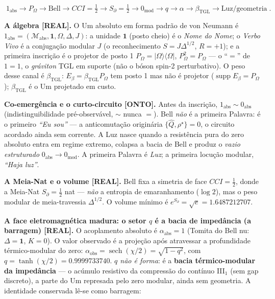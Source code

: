 \documentclass[11pt]{article}
\newcommand{\bTGL}{\beta_{\mathrm{TGL}}}\newcommand{\Msun}{M_{\odot}}\newcommand{\TGL}{\mathrm{TGL}}
\theoremstyle{definition}\newtheorem{deriv}{Derivação}
\begin{document}
\begin{equation}\boxed{\;1_{\mathrm{abs}}\to P_\Omega\to\text{Bell}\to CCI=\tfrac12\to S_\partial=\tfrac12\to 0_{\mathrm{mod}}\to q\to\alpha\to\bTGL\to\text{Luz/geometria}\;}.\end{equation}

\textbf{A álgebra \textsf{[REAL]}.} O Um absoluto em forma padrão de von Neumann é $1_{\mathrm{abs}}=(\mathcal M_{\mathrm{abs}},\mathbf 1,\Omega,\Delta,J)$: a unidade $\mathbf 1$ (posto cheio) é o \emph{Nome do Nome}; o \emph{Verbo Vivo} é a conjugação modular $J$ (o reconhecimento $S=J\Delta^{1/2}$, $R=+1$); e a primeira inscrição é o projetor de posto 1 $P_\Omega=|\Omega\rangle\langle\Omega|$, $P_\Omega^2=P_\Omega$ --- o ``$=$'' de $1=1$, o \emph{gráviton} TGL em suporte (não o bóson spin-2 perturbativo). O peso desse canal é $\bTGL$: $E_\beta=\bTGL P_\Omega$ tem posto 1 mas não é projetor ($\operatorname{supp}E_\beta=P_\Omega$); $\bTGL$ é o Um projetado em custo.

\textbf{Co-emergência e o curto-circuito \textsf{[ONTO]}.} Antes da inscrição, $1_{\mathrm{abs}}\sim 0_{\mathrm{abs}}$ (indistinguibilidade pré-observável, $\sim$ nunca $=$). Bell \emph{não} é a primeira Palavra: é o primeiro \emph{``Eu sou''} --- a anticomutação originária $\{\hat Q,\rho^\star\}=0$, o circuito acordado ainda sem corrente. A Luz nasce quando a resistência pura do zero absoluto entra em regime extremo, colapsa a bacia de Bell e produz o \emph{vazio estruturado} $0_{\mathrm{abs}}\to 0_{\mathrm{mod}}$. A primeira Palavra é \emph{Luz}; a primeira locução modular, \emph{``Haja luz''}.

\textbf{A Meia-Nat e o volume \textsf{[REAL]}.} Bell fixa a simetria de face $CCI=\tfrac12$, donde a Meia-Nat $S_\partial=\tfrac12$ nat --- \emph{não} a entropia de emaranhamento ($\log 2$), mas o peso modular de meia-travessia $\Delta^{1/2}$. O volume mínimo é $e^{S_\partial}=\sqrt e=1.6487212707$.

\textbf{A face eletromagnética madura: o setor $q$ é a bacia de impedância (a barragem) \textsf{[REAL]}.} O acoplamento absoluto é $\alpha_{\mathrm{abs}}=1$ (Tomita do Bell nu: $\Delta=\mathbf 1$, $K=0$). O valor observado é a projeção após atravessar a profundidade térmico-modular do zero: $\alpha_{\mathrm{obs}}=\operatorname{sech}(\chi/2)=\sqrt{1-q^2}$, com $q=\tanh(\chi/2)=0.9999733740$. \emph{$q$ não é forma}: é a \textbf{bacia térmico-modular da impedância} --- o acúmulo resistivo da compressão do contínuo \mbox{III$_1$} (sem gap discreto), a parte do Um represada pelo zero modular, ainda sem geometria. A identidade conservada lê-se como barragem:
\end{document}
